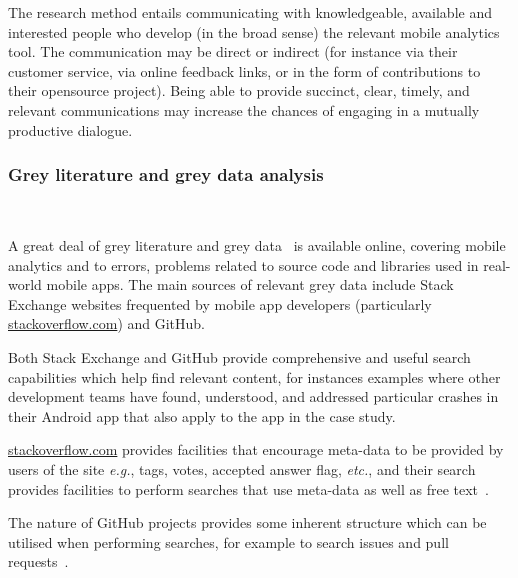 The research method entails communicating with knowledgeable, available and interested people who develop (in the broad sense) the relevant mobile analytics tool. The communication may be direct or indirect (for instance via their customer service, via online feedback links, or in the form of contributions to their opensource project). Being able to provide succinct, clear, timely, and relevant communications may increase the chances of engaging in a mutually productive dialogue.

\subsubsection{Grey literature and grey data analysis}~\label{section-grey-literature-and-data-analysis-research-method} %

A great deal of grey literature and grey data~ is available online, covering mobile analytics and to errors, problems related to source code and libraries used in real-world mobile apps. The main sources of relevant grey data include Stack Exchange websites frequented by mobile app developers (particularly \href{https://stackoverflow.com/}{stackoverflow.com}) and GitHub. 

Both Stack Exchange and GitHub provide comprehensive and useful search capabilities which help find relevant content, for instances examples where other development teams have found, understood, and addressed particular crashes in their Android app that also apply to the app in the case study.

\href{https://stackoverflow.com/}{stackoverflow.com} provides facilities that encourage meta-data to be provided by users of the site \textit{e.g.}, tags, votes, accepted answer flag, \textit{etc.}, and their search provides facilities to perform searches that use meta-data as well as free text~.

The nature of GitHub projects provides some inherent structure which can be utilised when performing searches, for example to search issues and pull requests~. 

